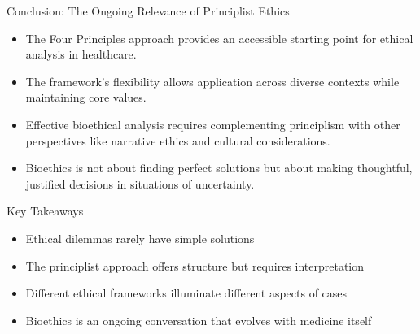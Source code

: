 \documentclass{beamer}
\begin{document}
	\begin{frame}{Conclusion: The Ongoing Relevance of Principlist Ethics}
		\begin{itemize}
			\item The Four Principles approach provides an accessible starting point for ethical analysis in healthcare.
			\item The framework's flexibility allows application across diverse contexts while maintaining core values.
			\item Effective bioethical analysis requires complementing principlism with other perspectives like narrative ethics and cultural considerations.
			\item Bioethics is not about finding perfect solutions but about making thoughtful, justified decisions in situations of uncertainty.
		\end{itemize}
		
		\begin{block}{Key Takeaways}
			\begin{itemize}
				\item Ethical dilemmas rarely have simple solutions
				\item The principlist approach offers structure but requires interpretation
				\item Different ethical frameworks illuminate different aspects of cases
				\item Bioethics is an ongoing conversation that evolves with medicine itself
			\end{itemize}
		\end{block}
	\end{frame}
	
	
\end{document}
